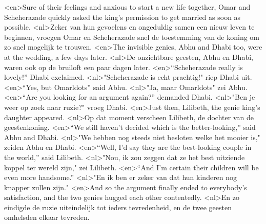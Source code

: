<en>Sure of their feelings and anxious to start a new life together, Omar and Scheherazade quickly asked the king’s permission to get married as soon as possible.
<nl>Zeker van hun gevoelens en ongeduldig samen een nieuw leven te beginnen, vroegen Omar en Scheherazade snel de toestemming van de koning om zo snel mogelijk te trouwen.
<en>The invisible genies, Abhu and Dhabi too, were at the wedding, a few days later.
<nl>De onzichtbare geesten,  Abhu en Dhabi, waren  ook  op de bruiloft een paar dagen later.
<en>“Scheherazade really is lovely!” Dhabi exclaimed.
<nl>"Scheherazade is echt prachtig!" riep Dhabi uit.
<en>“Yes, but Omarldots” said Abhu.
<nl>"Ja, maar Omarldots" zei Abhu.
<en>“Are you looking for an argument again?” demanded Dhabi.
<nl>"Ben je weer op zoek naar ruzie?" vroeg Dhabi.
<en>Just then, Lilibeth, the genie king’s daughter appeared.
<nl>Op dat moment verscheen Lilibeth, de dochter van de geestenkoning.
<en>“We still haven’t decided which is the better-looking,” said Abhu and Dhabi.
<nl>"We hebben nog steeds niet besloten welke het mooier is," zeiden Abhu en Dhabi.
<en>“Well, I’d say they are the best-looking couple in the world,” said Lilibeth.
<nl>"Nou, ik zou zeggen dat ze het best uitziende koppel ter wereld zijn," zei Lilibeth.
<en>“And I’m certain their children will be even more handsome.”
<nl>"En ik ben er zeker van dat hun kinderen nog knapper zullen zijn."
<en>And so the argument finally ended to everybody’s satisfaction, and the two genies hugged each other contentedly.
<nl>En zo eindigde de ruzie uiteindelijk tot ieders tevredenheid, en de twee geesten omhelsden elkaar tevreden.
